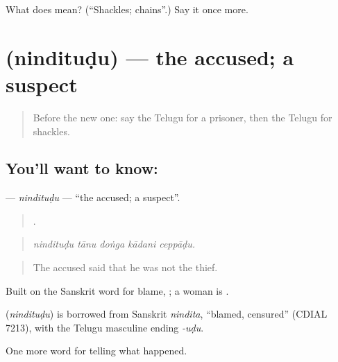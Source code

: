 \begin{tcolorbox}[breakable,colback=teal!4,colframe=teal!35!black,title={Before you move on}]
What does  mean? (\textquotedblleft{}Shackles; chains\textquotedblright{}.) Say it once more.
\end{tcolorbox}
\section[\texorpdfstring{\te{నిందితుడు} (nindituḍu)}{నిందితుడు (nindituḍu)}]{ (nindituḍu) — the accused; a suspect}

\label{lesson:TE-C337-ninditudu}



\begin{quote}
Before the new one: say the Telugu for a prisoner, then the Telugu for shackles.
\end{quote}

\subsection*{You'll want to know: }
\textbf{} — \emph{nindituḍu} — \textquotedblleft{}the accused; a suspect\textquotedblright{}.

\begin{quote}
    .
\end{quote}

\begin{quote}
\emph{nindituḍu tānu doṅga kādani ceppāḍu.}
\end{quote}

\begin{quote}
The accused said that he was not the thief.
\end{quote}

Built on the Sanskrit word for blame, ; a woman is .

\begin{cousinweb}
\textbf{} (\emph{nindituḍu}) is borrowed from Sanskrit \emph{nindita}, \textquotedblleft{}blamed, censured\textquotedblright{} (CDIAL 7213), with the Telugu masculine ending \emph{-uḍu}.
\end{cousinweb}

\begin{grammarlens}[title={What you've built}]
One more word for telling what happened.
\end{grammarlens}

